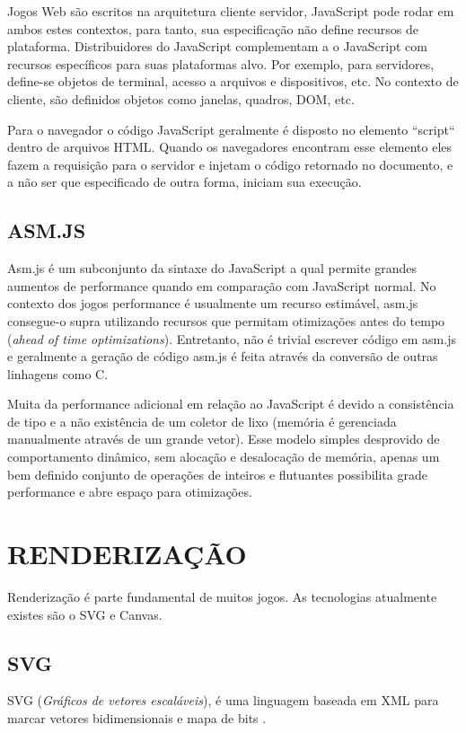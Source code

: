 \documentclass[
12pt,
a4paper,
portuges,
draft
]{report}
\begin{document}
Jogos Web são escritos na arquitetura cliente servidor, JavaScript pode
rodar em ambos estes contextos, para tanto, sua especificação não
define recursos de plataforma. Distribuidores do JavaScript complementam
a o JavaScript com recursos específicos para suas plataformas alvo.
Por exemplo, para servidores, define-se objetos de terminal, acesso a
arquivos e dispositivos, etc. No contexto de cliente, são definidos
objetos como janelas, quadros, DOM, etc.

Para o navegador o código JavaScript geralmente é disposto no elemento
``script`` dentro de arquivos HTML. Quando os navegadores encontram esse
elemento eles fazem a requisição para o servidor e injetam o código
retornado no documento, e a não ser que especificado de outra forma,
iniciam sua execução.


\subsection{ASM.JS}
Asm.js é um subconjunto da sintaxe do JavaScript a qual permite grandes
aumentos de performance quando em comparação com JavaScript normal.
No contexto dos jogos performance é usualmente um recurso estimável,
asm.js consegue-o supra utilizando recursos que permitam otimizações
antes do tempo (\textit{ahead of time optimizations}). Entretanto, não é
trivial escrever código em asm.js e geralmente a geração de código
asm.js é feita através da conversão de outras linhagens como C.

Muita da performance adicional em relação ao JavaScript é devido
a consistência de tipo e a não existência de um coletor de lixo
(memória é gerenciada manualmente através de um grande vetor). Esse
modelo simples desprovido de comportamento dinâmico, sem alocação
e desalocação de memória, apenas um bem definido conjunto de
operações de inteiros e flutuantes possibilita grade performance e
abre espaço para otimizações.


\section{RENDERIZAÇÃO}

Renderização é parte fundamental de muitos jogos. As tecnologias atualmente existes são o SVG e Canvas.

\subsection{SVG}
SVG (\textit{Gráficos de vetores escaláveis}), é uma linguagem baseada em XML para marcar vetores bidimensionais e mapa de bits \autocite{html5mostwanted}.
\end{document}
